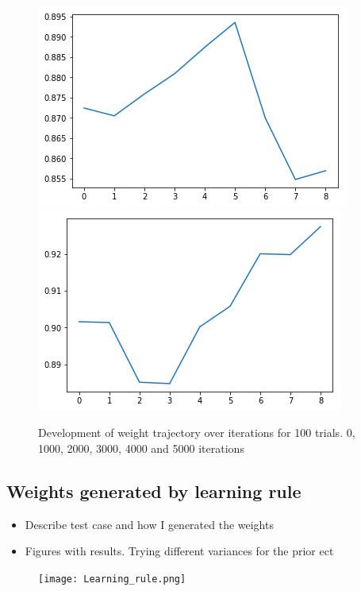 \begin{figure}[hbt!]
    \includegraphics[scale = 0.3]{fig/4000_it_100.png}
    \includegraphics[scale = 0.3]{fig/5000_it_100.png}
    \caption{Development of weight trajectory over iterations for 100 trials. 0, 1000, 2000, 3000, 4000 and 5000 iterations}
    \label{w_trajectory_1000}
\end{figure}

\subsection{Weights generated by learning rule}

\begin{itemize}
    \item Describe test case and how I generated the weights
    \item Figures with results. Trying different variances for the prior ect
\end{itemize}

\begin{figure}[hbt!]
    \centering
    \texttt{[image: Learning\_rule.png]}
\end{figure}

\cleardoublepage